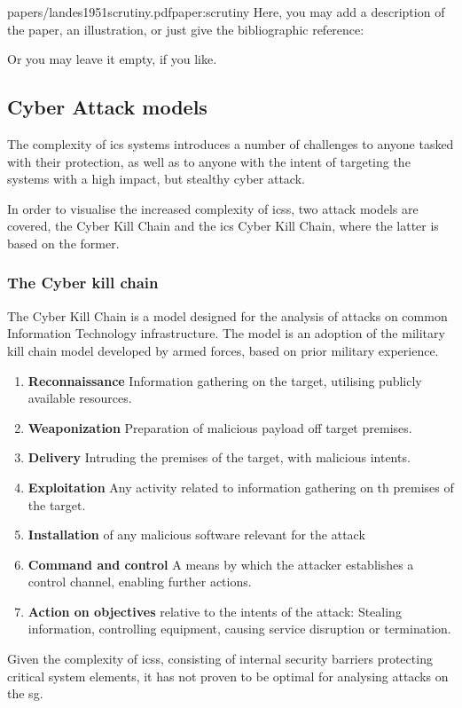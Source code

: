 
\begin{paper}{papers/landes1951scrutiny.pdf}{paper:scrutiny}
    Here, you may add a description of the paper, an illustration, or just give the bibliographic reference:
    \begin{quote}
    \end{quote}
    Or you may leave it empty, if you like.
\end{paper}



\subsection{Cyber Attack models}

The complexity of \acrshort{ics} systems introduces a number of challenges to anyone tasked with their protection, as well as to anyone with the intent of targeting the systems with a high impact, but stealthy  cyber attack.


In order to visualise the increased complexity of \acrshort{ics}s, two attack models are covered, the Cyber Kill Chain and the \acrlong{ics} Cyber Kill Chain, where the latter is based on the former.

\subsubsection{The Cyber kill chain}
The Cyber Kill Chain is a model designed for the analysis of attacks on common Information Technology infrastructure. The model is an adoption of the military kill chain model developed by armed forces, based on prior military experience.
\begin{enumerate}
    \item \textbf{Reconnaissance} Information gathering on the target, utilising publicly available resources.
    \item \textbf{Weaponization} Preparation of malicious payload off target premises.
    \item \textbf{Delivery} Intruding the premises of the target, with malicious intents.  
    \item \textbf{Exploitation} Any activity related to information gathering on th premises of the target.
    \item \textbf{Installation} of any malicious software relevant for the attack
    \item \textbf{Command and control} A means by which the attacker establishes a control channel, enabling further actions.
    \item \textbf{Action on objectives} relative to the intents of the attack: Stealing information, controlling equipment, causing service disruption or termination.
\end{enumerate}
Given the complexity of \acrlong{ics}s, consisting of internal security barriers protecting critical system elements, it has not proven to be optimal for analysing attacks on the \acrshort{sg}.\\ 

